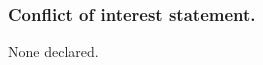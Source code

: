 \documentclass[a4,center,fleqn]{NAR}
\begin{document}
\subsubsection{Conflict of interest statement.} None declared.
\newpage



%
%
%
%
%
%
\end{document}
